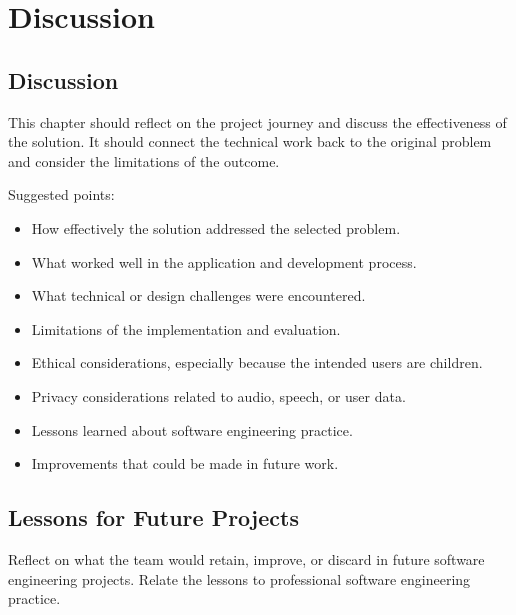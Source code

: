 \chapter{Discussion}
\label{ch:discussion}

\section{Discussion}
\label{sec:discussion}

This chapter should reflect on the project journey and discuss the effectiveness of the solution. It should connect the technical work back to the original problem and consider the limitations of the outcome.

Suggested points:
\begin{itemize}[noitemsep]
  \item How effectively the solution addressed the selected problem.
  \item What worked well in the application and development process.
  \item What technical or design challenges were encountered.
  \item Limitations of the implementation and evaluation.
  \item Ethical considerations, especially because the intended users are children.
  \item Privacy considerations related to audio, speech, or user data.
  \item Lessons learned about software engineering practice.
  \item Improvements that could be made in future work.
\end{itemize}

\section{Lessons for Future Projects}
\label{sec:lessons-for-future-projects}

Reflect on what the team would retain, improve, or discard in future software engineering projects. Relate the lessons to professional software engineering practice.

